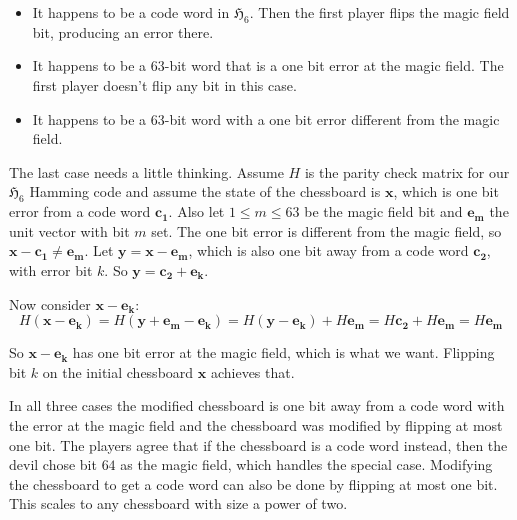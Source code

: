 \begin{itemize}
\item  It happens to be a code word in $\mathfrak{H}_6$. Then the first player flips the magic field bit, producing an error there.

\item It happens to be a $63$-bit word that is a one bit error at the magic field. The first player doesn't flip any bit in this case.

\item It happens to be a $63$-bit word with a one bit error different from the magic field.
\end{itemize}

The last case needs a little thinking. Assume $H$ is the parity check matrix for our $\mathfrak{H}_6$ Hamming code and assume the state of the chessboard is $\bm{x}$, which is one bit error from a code word $\bm{c_1}$. Also let $1 \leq m \leq 63$ be the magic field bit and $\bm{e_m}$ the unit vector with bit $m$ set. The one bit error is different from the magic field, so $\bm{x} - \bm{c_1} \neq \bm{e_m}$. Let $\bm{y} = \bm{x} - \bm{e_m}$, which is also one bit away from a code word $\bm{c_2}$, with error bit $k$. So 
$\bm{y} = \bm{c_2} + \bm{e_k}$.

Now consider $\bm{x} - \bm{e_k}$:
$$
H (\bm{x} - \bm{e_k}) = H (\bm{y} + \bm{e_m} - \bm{e_k}) = H (\bm{y} - \bm{e_k}) + H \bm{e_m} = H \bm{c_2} + H \bm{e_m} = H \bm{e_m}
$$

So $\bm{x} - \bm{e_k}$ has one bit error at the magic field, which is what we want. Flipping bit $k$ on the initial chessboard $\bm{x}$ achieves that.

In all three cases the modified chessboard is one bit away from a code word with the error at the magic field and the chessboard was modified by flipping at most one bit. The players agree that if the chessboard is a code word instead, then the devil chose bit $64$ as the magic field, which handles the special case. Modifying the chessboard to get a code word can also be done by flipping at most one bit. This scales to any chessboard with size a power of two.

\newpage

